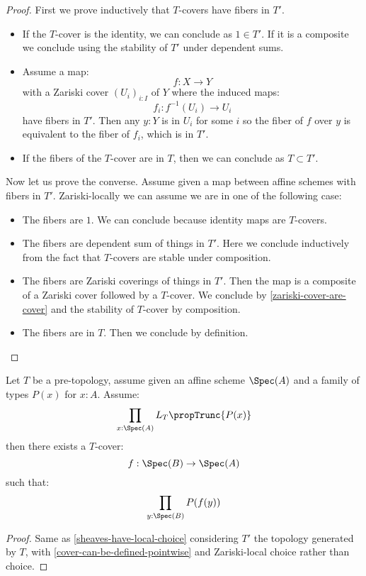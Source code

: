 \begin{proof}
First we prove inductively that $T$-covers have fibers in $T'$. 
\begin{itemize}
\item If the $T$-cover is the identity, we can conclude as $1\in T'$. If it is a composite we conclude using the stability of $T'$ under dependent sums.
\item Assume a map:
\[f:X\to Y\] 
with a Zariski cover $(U_i)_{i:I}$ of $Y$ where the induced maps:
\[f_i:f^{-1}(U_i) \to U_i\]
have fibers in $T'$. Then any $y:Y$ is in $U_i$ for some $i$ so the fiber of $f$ over $y$ is equivalent to the fiber of $f_i$, which is in $T'$.
\item If the fibers of the $T$-cover are in $T$, then we can conclude as $T\subset T'$.
\end{itemize}
Now let us prove the converse. Assume given a map between affine schemes with fibers in $T'$. Zariski-locally we can assume we are in one of the following case:
\begin{itemize}
\item The fibers are $1$. We can conclude because identity maps are $T$-covers.
\item The fibers are dependent sum of things in $T'$. Here we conclude inductively from the fact that  $T$-covers are stable under composition.
\item The fibers are Zariski coverings of things in $T'$. Then the map is a composite of a Zariski cover followed by a $T$-cover. We conclude by \cref{zariski-cover-are-cover} and the stability of $T$-cover by composition. 
\item The fibers are in $T$. Then we conclude by definition.
\end{itemize}
\end{proof}

\begin{lemma}\label{cover-local-choice}
Let $T$ be a pre-topology, assume given an affine scheme $\Spec(A)$ and a family of types $P(x)$ for $x:A$. Assume:
\[\prod_{x:\Spec(A)}L_T\propTrunc{P(x)}\]
then there exists a $T$-cover:
\[f:\Spec(B)\to \Spec(A)\]
such that:
\[\prod_{y:\Spec(B)} P(f(y))\]
\end{lemma}

\begin{proof}
Same as \cref{sheaves-have-local-choice} considering $T'$ the topology generated by $T$, with \cref{cover-can-be-defined-pointwise} and Zariski-local choice rather than choice.
\end{proof}


